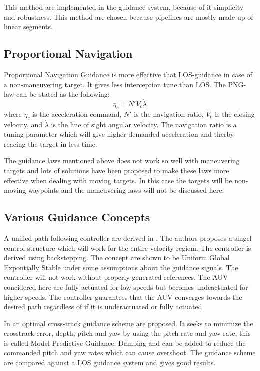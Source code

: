 		This method are implemented in the guidance system, because of it simplicity and robustness.
		This method are chosen because pipelines are mostly made up of linear segments. 

	
	\subsection{Proportional Navigation}
		Proportional Navigation Guidance is more effective that LOS-guidance in case of a
		non-maneuvering
		target. It gives less interception time than LOS. The PNG-law can be stated as the following:
		\cite{GuidanceReview}
		\begin{equation}
			\eta_c = N' V_c \dot{\lambda}
		\end{equation}
		where $\eta_c$ is the acceleration command, $N'$ is the navigation ratio, $V_c$ is the closing
		velocity, and $\dot{\lambda}$ is the line of sight angular velocity. The navigation ratio is a
		tuning
		parameter which will give higher demanded acceleration and therby reacing the target in less
		time.

        	The guidance laws mentioned above does not work so well with maneuvering targets and lots of
		solutions have been proposed to make these laws more effective when dealing with moving
		targets. In this case the targets will be non-moving waypoints and the maneuvering laws
		will not be discussed here.
	
	
	\subsection{Various Guidance Concepts}
		A unified path following controller are derived in \cite{control-concept-AUV}. The 
		authors proposes a singel control structure which will work for the entire velocity regiem.
		The controller is derived using backstepping. The concept are shown to be Uniform Global
		Expontially Stable under some assumptions about the guidance signals. The controller will not
		work without properly generated references. The AUV concidered here are fully actuated for low
		speeds but becomes undeactuated for higher speeds. The controller guarantees that the AUV
		converges towards the desired path regardless of if it is underactuated or fully actuated.
		
		In \cite{optimal-cross-track} an optimal cross-track guidance scheme are proposed. It seeks to minimize
		the crosstrack-error, depth, pitch and yaw by using the pitch rate and yaw rate, this is called Model
		Predictive Guidance. Damping and can be added to reduce the commanded pitch and yaw rates which can
		cause overshoot. The guidance scheme are compared against a LOS guidance system and gives good
		results.

